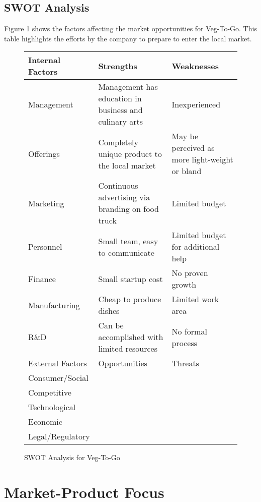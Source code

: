 \documentclass[12pt, letterpaper]{article}
\newcommand{\companyname}{Veg-To-Go}
\begin{document}
\subsection{SWOT Analysis}
Figure 1 shows the factors affecting the market opportunities for \companyname.  This table highlights the efforts by the company to prepare to enter the local market.
\begin{figure}[h]
\caption{SWOT Analysis for \companyname}
\begin{center}
\bgroup
\def\arraystretch{1.5}%
    \begin{tabularx}{\textwidth}{|X X X|}
    \hline
    Internal Factors & Strengths & Weaknesses\\
    \hline
    Management & Management has education in business and culinary arts & Inexperienced\\
	\hline    
    Offerings & Completely unique product to the local market & May be perceived as more light-weight or bland\\
\hline    
    Marketing & Continuous advertising via branding on food truck & Limited budget\\
\hline    
    Personnel & Small team, easy to communicate & Limited budget for additional help\\
\hline    
    Finance & Small startup cost & No proven growth\\
\hline    
    Manufacturing & Cheap to produce dishes & Limited work area\\
\hline    
    R\&D & Can be accomplished with limited resources & No formal process\\
    \hline
    \hline
    External Factors & Opportunities & Threats \\
    \hline
    Consumer/Social && \\
\hline    
    Competitive && \\
\hline    
    Technological && \\
\hline    
    Economic && \\
\hline    
    Legal/Regulatory && \\
    \hline
    \end{tabularx}
    \egroup
\end{center}
\end{figure}

\section{Market-Product Focus}
\end{document}
